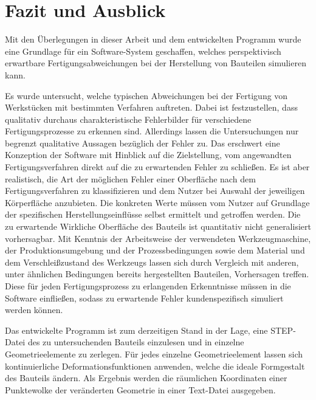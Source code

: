 \section{Fazit und Ausblick}

Mit den Überlegungen in dieser Arbeit und dem entwickelten Programm wurde eine Grundlage für ein Software-System geschaffen, welches perspektivisch erwartbare Fertigungsabweichungen bei der Herstellung von Bauteilen simulieren kann.

Es wurde untersucht, welche typischen Abweichungen bei der Fertigung von Werkstücken mit bestimmten Verfahren auftreten. Dabei ist festzustellen, dass qualitativ durchaus charakteristische Fehlerbilder für verschiedene Fertigungsprozesse zu erkennen sind. Allerdings lassen die Untersuchungen nur begrenzt qualitative Aussagen bezüglich der Fehler zu. Das erschwert eine Konzeption der Software mit Hinblick auf die Zielstellung, vom angewandten Fertigungsverfahren direkt auf die zu erwartenden Fehler zu schließen. Es ist aber realistisch, die Art der möglichen Fehler einer Oberfläche nach dem Fertigungsverfahren zu klassifizieren und dem Nutzer bei Auswahl der jeweiligen Körperfläche anzubieten. Die konkreten Werte müssen vom Nutzer auf Grundlage der spezifischen Herstellungseinflüsse selbst ermittelt und getroffen werden. Die zu erwartende Wirkliche Oberfläche des Bauteils ist quantitativ nicht generalisiert vorhersagbar. Mit Kenntnis der Arbeitsweise der verwendeten Werkzeugmaschine, der Produktionsumgebung und der Prozessbedingungen sowie dem Material und dem Verschleißzustand des Werkzeugs lassen sich durch Vergleich mit anderen, unter ähnlichen Bedingungen bereits hergestellten Bauteilen, Vorhersagen treffen.
Diese für jeden Fertigungsprozess zu erlangenden Erkenntnisse müssen in die Software einfließen, sodass zu erwartende Fehler kundenspezifisch simuliert werden können. 

Das entwickelte Programm ist zum derzeitigen Stand in der Lage, eine STEP-Datei des zu untersuchenden Bauteils einzulesen und in einzelne Geometrieelemente zu zerlegen. Für jedes einzelne Geometrieelement lassen sich kontinuierliche Deformationsfunktionen anwenden, welche die ideale Formgestalt des Bauteils ändern. Als Ergebnis werden die räumlichen Koordinaten einer Punktewolke der veränderten Geometrie in einer Text-Datei ausgegeben. 

